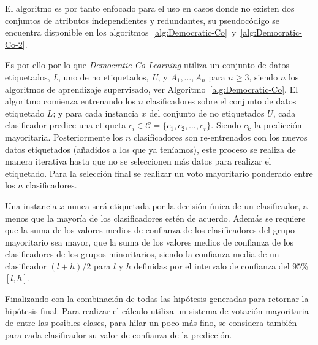 El algoritmo es por tanto enfocado para el uso en casos donde no existen dos conjuntos de atributos independientes y redundantes, su pseudocódigo se encuentra disponible en los algoritmos~\ref{alg:Democratic-Co}~y~\ref{alg:Democratic-Co-2}.

Es por ello por lo que \textit{Democratic Co-Learning} utiliza un conjunto de datos etiquetados, \textit{L}, uno de no etiquetados, \textit{U}, y $A_1,\dots ,A_n$ para $n \geq 3$, siendo $n$ los algoritmos de aprendizaje supervisado, ver Algoritmo~\ref{alg:Democratic-Co}. El algoritmo comienza entrenando los $n$ clasificadores sobre el conjunto de datos etiquetado $L$; y para cada instancia $x$ del conjunto de no etiquetados $U$, cada clasificador predice una etiqueta $c_i \in \mathcal{C} = \lbrace c_1, c_2, \dots , c_r\rbrace$. Siendo $c_k$ la predicción mayoritaria. Posteriormente los $n$ clasificadores son re-entrenados con los nuevos datos etiquetados (añadidos a los que ya teníamos), este proceso se realiza de manera iterativa hasta que no se seleccionen más datos para realizar el etiquetado. Para la selección final se realizar un voto mayoritario ponderado entre los $n$ clasificadores. 

Una instancia $x$ nunca será etiquetada por la decisión única de un clasificador, a menos que la mayoría de los clasificadores estén de acuerdo. Además se requiere que la suma de los valores medios de confianza de los clasificadores del grupo mayoritario sea mayor, que la suma de los valores medios de confianza de los clasificadores de los grupos minoritarios, siendo la confianza media de un clasificador $ (l + h)/2
$ para $l$ y $h$ definidas por el intervalo de confianza del 95\% $\left[l,h\right]$.

Finalizando con la combinación de todas las hipótesis generadas para retornar la hipótesis final. Para realizar el cálculo utiliza un sistema de votación mayoritaria de entre las posibles clases, para hilar un poco más fino, se considera también para cada clasificador su valor de confianza de la predicción. 

